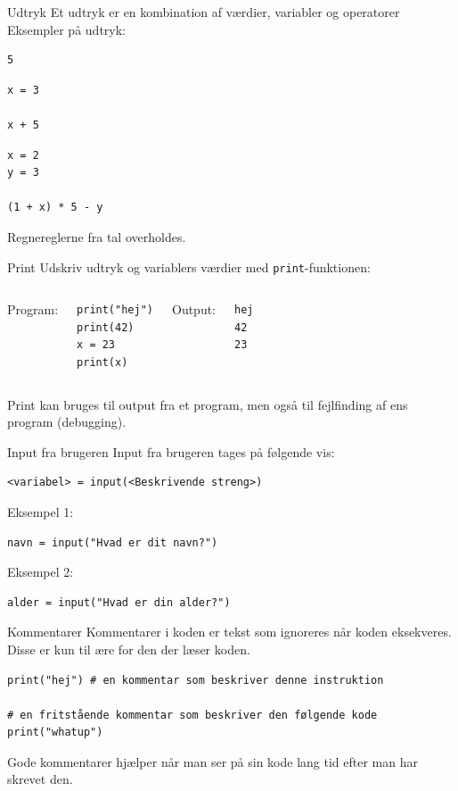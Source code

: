 \documentclass{beamer}
\begin{document}
\begin{frame}[fragile]{Udtryk}
Et udtryk er en kombination af værdier, variabler og operatorer\\
Eksempler på udtryk:
\begin{lstlisting}[style=python]
5
\end{lstlisting}
\begin{lstlisting}[style=python]
x = 3

x + 5
\end{lstlisting}
\begin{lstlisting}[style=python]
x = 2
y = 3

(1 + x) * 5 - y
\end{lstlisting}
Regnereglerne fra tal overholdes.
\end{frame}

\begin{frame}[fragile]{Print}
Udskriv udtryk og variablers værdier med \texttt{print}-funktionen:
\bigskip
\begin{columns}
Program:
\begin{lstlisting}[style=python]
print("hej")
print(42)
x = 23
print(x)
\end{lstlisting}
Output:
\begin{lstlisting}[style=python]
hej
42
23
\end{lstlisting}
\end{columns}
Print kan bruges til output fra et program, men også til fejlfinding af ens program (debugging).
\end{frame}

\begin{frame}[fragile]{Input fra brugeren}
Input fra brugeren tages på følgende vis:
\begin{lstlisting}[style=python]
<variabel> = input(<Beskrivende streng>)
\end{lstlisting}
Eksempel 1:
\begin{lstlisting}[style=python]
navn = input("Hvad er dit navn?")
\end{lstlisting}
Eksempel 2:
\begin{lstlisting}[style=python]
alder = input("Hvad er din alder?")
\end{lstlisting}
\end{frame}

\begin{frame}[fragile]{Kommentarer}
Kommentarer i koden er tekst som ignoreres når koden eksekveres. Disse er kun til ære for den der læser koden.
\begin{lstlisting}[style=python]
print("hej") # en kommentar som beskriver denne instruktion

# en fritstående kommentar som beskriver den følgende kode
print("whatup")
\end{lstlisting}
Gode kommentarer hjælper når man ser på sin kode lang tid efter man har skrevet den.
\end{frame}
\end{document}
